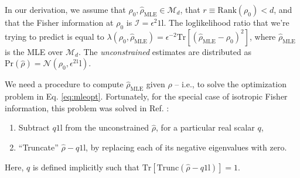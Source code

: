 \documentclass[aps,pra, twocolumn]{revtex4}
\newcommand{\M}{\mathcal{M}}
\newcommand{\Tr}{\mathrm{Tr}}
\def\Id{1\!\mathrm{l}}
\newcommand{\Fi}{\mathcal{I}}
\newcommand{\rhohat}{\hat{\rho}}
\newcommand{\rhoMLE}{\rhohat_{\scriptscriptstyle\mathrm{MLE}}}
\begin{document}
In our derivation, we assume that $\rho_{0}, \rhoMLE \in \M_{d}$, that $r \equiv \mathrm{Rank}(\rho_{0}) < d$, and that the Fisher information at $\rho_0$ is $\Fi  = \epsilon^{2} \Id$.  The loglikelihood ratio that we're trying to predict is equal to $\lambda(\rho_0, \rhoMLE) = \epsilon^{-2}\Tr{[(\rhoMLE - \rho_{0})^2]}$, where $\rhoMLE$ is the MLE over $\M_{d}$.  The \emph{unconstrained} estimates are distributed as $\mathrm{Pr}(\rhohat) = \mathcal{N}(\rho_0,\epsilon^2\Id)$. 

We need a procedure to compute $\rhoMLE$ given $\rhohat$ -- i.e., to solve the optimization problem in Eq. \eqref{eq:mleopt}.  Fortunately, for the special case of isotropic Fisher information, this problem was solved in Ref. \cite{Smolin2012}:
\begin{enumerate}[noitemsep]
\item Subtract $q\Id$ from the unconstrained $\hat\rho$, for a particular real scalar $q$,
\item ``Truncate'' $\hat\rho-q\Id$, by replacing each of its negative eigenvalues with zero.
\end{enumerate}
Here, $q$ is defined implicitly such that $\Tr\left[ \mathrm{Trunc}(\hat\rho-q\Id)\right] = 1$.
\end{document}
